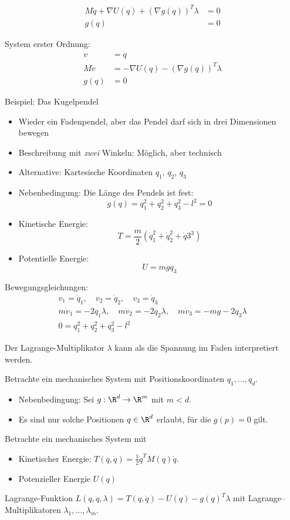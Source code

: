 \begin{align*}
  M \ddot q + \nabla U(q) + (\nabla g(q))^T \lambda & = 0 \\
  g(q) & = 0
\end{align*}

System erster Ordnung:
\begin{align*}
  v & = \dot q \\
  M \dot v & = - \nabla U(q) - (\nabla g(q))^T \lambda \\
  g(q) & = 0
\end{align*}

Beispiel: Das Kugelpendel
\begin{itemize}
\item Wieder ein Fadenpendel, aber das Pendel darf sich in drei Dimensionen bewegen
\item Beschreibung mit \emph{zwei} Winkeln:
  Möglich, aber technisch
\item Alternative: Kartesische Koordinaten $q_1$, $q_2$, $q_3$
\item Nebenbedingung: Die Länge des Pendels ist fest:
  \begin{equation*}
    g(q) = q_1^2 + q_2^2 + q_3^2 - l^2 = 0
  \end{equation*}
\item Kinetische Energie:
  \begin{equation*}
    T = \frac m2 (\dot q_1^2 + \dot q_2^2 + \dot q 3^3)
  \end{equation*}
\item Potentielle Energie:
  \begin{equation*}
    U = m g q_3
  \end{equation*}
\end{itemize}

Bewegungsgleichungen:
\begin{align*}
  v_1 = \dot q_1, \quad
  v_2 = \dot q_2, \quad
  v_3 = \dot q_3
  \\
  m \dot v_1 = -2 q_1 \lambda, \quad
  m \dot v_2 = -2 q_2 \lambda, \quad
  m \dot v_3 = - m g - 2 q_3 \lambda
  \\
  0 = q_1^2 + q_2^2 + q_3^2 - l^2
\end{align*}

Der Lagrange-Multiplikator $\lambda$ kann als die Spannung im Faden interpretiert werden.

Betrachte ein mechanisches System mit Positionskoordinaten $q_1,..., q_d$.
\begin{itemize}
\item Nebenbedingung: Sei $g: \R^d \rightarrow \R^m$ mit $m < d$.
\item Es sind nur solche Positionen $q \in \R^d$ erlaubt, für die $g(p) = 0$ gilt.
\end{itemize}
Betrachte ein mechanisches System mit
\begin{itemize}
\item Kinetischer Energie: $T(q,\dot{q}) = \frac{1}{2} \dot{q}^T M(q) \dot{q}$.
\item Potenzieller Energie $U(q)$
\end{itemize}
Lagrange-Funktion $L(q, \dot{q}, \lambda) = T (q, \dot{q}) - U(q) - g(q)^T \lambda $ mit Lagrange--Multiplikatoren $\lambda_1, ..., \lambda_m$.

